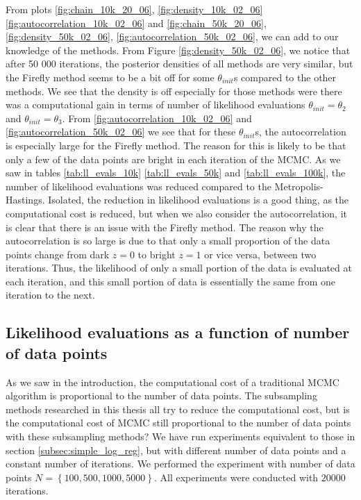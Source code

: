 From plots \ref{fig:chain_10k_20_06}, \ref{fig:density_10k_02_06} \ref{fig:autocorrelation_10k_02_06} and \ref{fig:chain_50k_20_06}, \ref{fig:density_50k_02_06}, \ref{fig:autocorrelation_50k_02_06}, we can add to our knowledge of the methods. 
From Figure \ref{fig:density_50k_02_06},  we  notice that after 50 000 iterations, the posterior densities of all methods are very similar, but the Firefly method seems to be a bit off for some $\theta_{init}$s compared to the other methods. We see that the density is off especially for those methods were there was a computational gain in terms of number of likelihood evaluations $\theta_{init} = \theta_2$ and $\theta_{init} = \theta_3$. From  \ref{fig:autocorrelation_10k_02_06} and \ref{fig:autocorrelation_50k_02_06} we see that for these $\theta_{init}$s, the autocorrelation is especially large for the Firefly method. 
The reason for this is likely to be that only a few of the data points are bright in each iteration of the MCMC. As we saw in tables \ref{tab:ll_evals_10k} \ref{tab:ll_evals_50k} and \ref{tab:ll_evals_100k}, the number of likelihood evaluations was reduced compared to the Metropolis-Hastings.
Isolated, the reduction in likelihood evaluations is a good thing, as the computational cost is reduced, but when we also consider the autocorrelation, it is clear that there is an issue with the Firefly method. 
The reason why the autocorrelation is so large is due to that only a small proportion of the data points change from dark $z = 0$ to bright $z = 1$ or vice versa, between two iterations. 
Thus, the likelihood of only a small portion of the data is evaluated at each iteration, and this small portion of data is essentially the same from one iteration to the next. 

\subsection{Likelihood evaluations as a function of number of data points}As we saw in the introduction, the computational cost of a traditional MCMC algorithm is proportional to the number of data points. 
The subsampling methods researched in this thesis all try to reduce the computational cost, but is the computational cost of MCMC still proportional to the number of data points with these subsampling methods? 
We have run experiments equivalent to those in section \ref{subsec:simple_log_reg}, but with different number of data points and a constant number of iterations. We performed the experiment with number of data points $N = \left\{100, 500, 1000, 5000\right\}$. All experiments were conducted with $20000$ iterations. 

